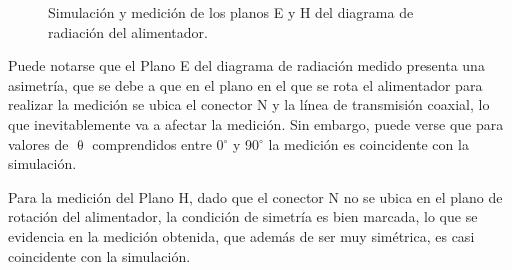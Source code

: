 \begin{figure} [H]
\centering 
{}
\caption{Simulación y medición de los planos E y H del diagrama de radiación del alimentador.}
\label{grup_fig_resultados:3}
\end{figure}
Puede notarse que el Plano E del diagrama de radiación medido presenta una asimetría, que se debe a que en el plano en el que se rota el alimentador para realizar la medición se ubica el conector N y la línea de transmisión coaxial, lo que inevitablemente va a afectar la medición. Sin embargo, puede verse que para valores de $\uptheta$ comprendidos entre 0$^{\circ}$ y 90$^{\circ}$ la medición es coincidente con la simulación.

Para la medición del Plano H, dado que el conector N no se ubica en el plano de rotación del alimentador, la condición de simetría es bien marcada, lo que se evidencia en la medición obtenida, que además de ser muy simétrica, es casi coincidente con la simulación.

